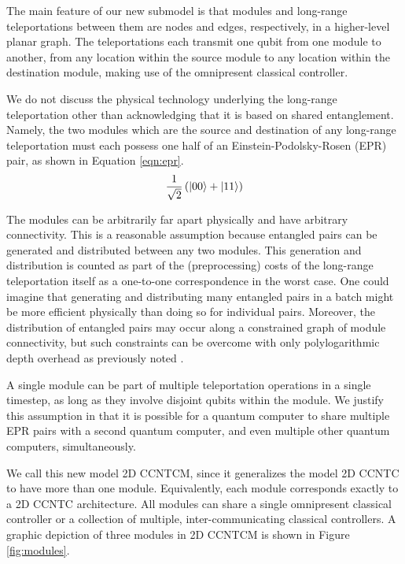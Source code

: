 The main feature of our new submodel is that modules
and long-range teleportations between them are nodes and edges, respectively,
in a higher-level planar graph. The teleportations each transmit one qubit
from one module to another, from any location within the source module
to any location within the destination module, making use of the
omnipresent classical controller.

We do not discuss the physical technology underlying the long-range
teleportation other than acknowledging that it is based on shared
entanglement. Namely, the two modules which are the source and destination
of any long-range teleportation must each possess one half of an
Einstein-Podolsky-Rosen (EPR) pair, as shown in Equation \ref{eqn:epr}.
%
\begin{equation}
\frac{1}{\sqrt{2}} \left( \left\vert{00}\right\rangle + \left\vert{11}\right\rangle \right)
\label{eqn:epr}
\end{equation}


 The modules can be arbitrarily far
apart physically and have arbitrary connectivity. This is a reasonable
assumption because entangled pairs can be generated and distributed between
any two modules. This generation and distribution is counted as part of
the (preprocessing) costs of the long-range teleportation itself as a
one-to-one correspondence in the worst case. One could imagine that 
generating and distributing many entangled pairs in a batch might be more
efficient physically than doing so for individual pairs. Moreover, the
distribution of entangled pairs may occur along a constrained graph of
module connectivity, but such constraints can be overcome with only
polylogarithmic depth overhead as previously noted \cite{Beals2012}.

A single module can be part of multiple teleportation operations in a single
timestep, as long as they involve disjoint qubits within the module.
We justify this assumption in that it is
possible for a quantum computer to share multiple EPR pairs with a
second quantum computer, and even multiple other quantum computers,
simultaneously.

We call this new model \textsf{2D CCNTCM}, since it generalizes the
model \textsf{2D CCNTC} to have more than one module. Equivalently,
each module corresponds exactly to a \textsf{2D CCNTC} architecture.
All modules can share a single omnipresent
classical controller or a collection of multiple, inter-communicating classical controllers.
A graphic depiction of three modules in \textsf{2D CCNTCM} is shown in
Figure \ref{fig:modules}.

